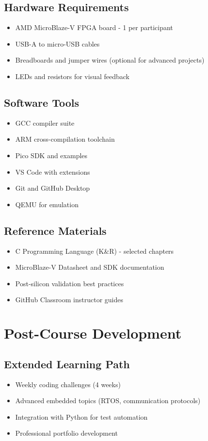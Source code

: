\documentclass[11pt,a4paper]{article}
\begin{document}
\subsection{Hardware Requirements}
\begin{itemize}
    \item AMD MicroBlaze-V FPGA board - 1 per participant
    \item USB-A to micro-USB cables
    \item Breadboards and jumper wires (optional for advanced projects)
    \item LEDs and resistors for visual feedback
\end{itemize}

\subsection{Software Tools}
\begin{itemize}
    \item GCC compiler suite
    \item ARM cross-compilation toolchain
    \item Pico SDK and examples
    \item VS Code with extensions
    \item Git and GitHub Desktop
    \item QEMU for emulation
\end{itemize}

\subsection{Reference Materials}
\begin{itemize}
    \item C Programming Language (K\&R) - selected chapters
    \item MicroBlaze-V Datasheet and SDK documentation
    \item Post-silicon validation best practices
    \item GitHub Classroom instructor guides
\end{itemize}

\section{Post-Course Development}

\subsection{Extended Learning Path}
\begin{itemize}
    \item Weekly coding challenges (4 weeks)
    \item Advanced embedded topics (RTOS, communication protocols)
    \item Integration with Python for test automation
    \item Professional portfolio development
\end{itemize}
\end{document}
